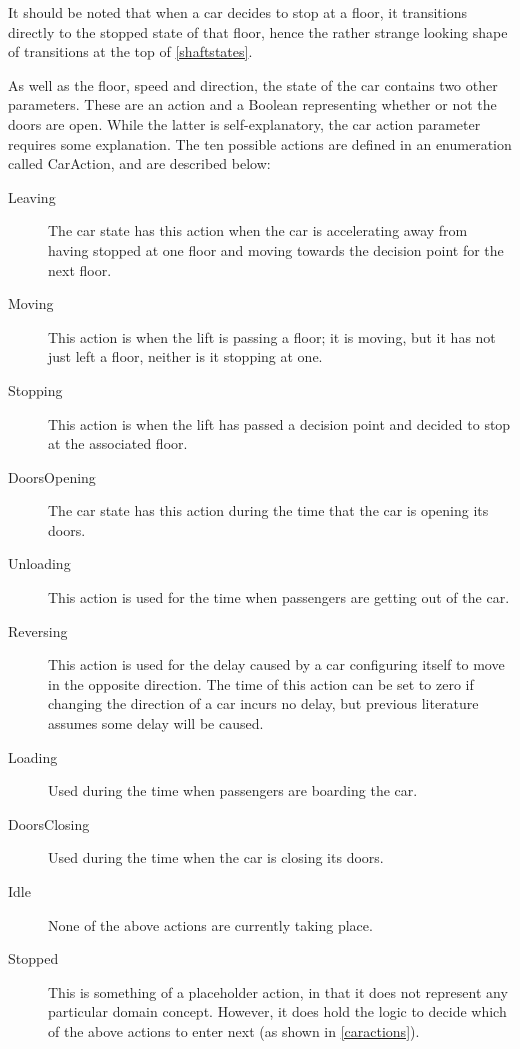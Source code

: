 \documentclass{UoYCSproject}
\begin{document}
It should be noted that when a car decides to stop at a floor, it transitions directly to the stopped state of that floor, hence the rather strange looking shape of transitions at the top of \autoref{shaftstates}.

As well as the floor, speed and direction, the state of the car contains two other parameters.  These are an action and a Boolean representing whether or not the doors are open.  While the latter is self-explanatory, the car action parameter requires some explanation.  The ten possible actions are defined in an enumeration called CarAction, and are described below:
\begin{description}
	\item[Leaving] The car state has this action when the car is accelerating away from having stopped at one floor and moving towards the decision point for the next floor.
	\item[Moving] This action is when the lift is passing a floor; it is moving, but it has not just left a floor, neither is it stopping at one.
	\item[Stopping] This action is when the lift has passed a decision point and decided to stop at the associated floor.
	\item[DoorsOpening] The car state has this action during the time that the car is opening its doors.
	\item[Unloading] This action is used for the time when passengers are getting out of the car.
	\item[Reversing] This action is used for the delay caused by a car configuring itself to move in the opposite direction.  The time of this action can be set to zero if changing the direction of a car incurs no delay, but previous literature assumes some delay will be caused.
	\item[Loading] Used during the time when passengers are boarding the car.
	\item[DoorsClosing] Used during the time when the car is closing its doors.
	\item[Idle] None of the above actions are currently taking place.
	\item[Stopped] This is something of a placeholder action, in that it does not represent any particular domain concept.  However, it does hold the logic to decide which of the above actions to enter next (as shown in \autoref{caractions}).
\end{description}
\end{document}
